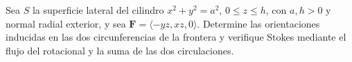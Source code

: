 ﻿Sea $S$ la superficie lateral del cilindro $x^2+y^2=a^2$, $0\leq z\leq h$, con $a,h>0$ y normal radial exterior, y sea $\mathbf F=\langle-yz,xz,0\rangle$. Determine las orientaciones inducidas en las dos circunferencias de la frontera y verifique Stokes mediante el flujo del rotacional y la suma de las dos circulaciones.
